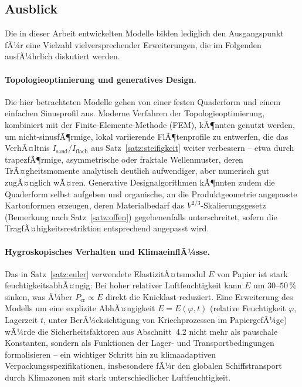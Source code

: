 ﻿\documentclass[a4paper,12pt]{article}
\theoremstyle{definition}
\begin{document}
\subsection{Ausblick}

Die in dieser Arbeit entwickelten Modelle bilden lediglich den Ausgangspunkt fÃ¼r
eine Vielzahl vielversprechender Erweiterungen, die im Folgenden ausfÃ¼hrlich
diskutiert werden.

\paragraph{Topologieoptimierung und generatives Design.}
Die hier betrachteten Modelle gehen von einer festen Quaderform und einem
einfachen Sinusprofil aus. Moderne Verfahren der Topologieoptimierung, kombiniert
mit der Finite-Elemente-Methode (FEM), kÃ¶nnten genutzt werden, um nicht-sinusfÃ¶rmige,
lokal variierende FlÃ¶tenprofile zu entwerfen, die das VerhÃ¤ltnis
$I_{\mathrm{sand}}/I_{\mathrm{flach}}$ aus Satz~\ref{satz:steifigkeit} weiter
verbessern -- etwa durch trapezfÃ¶rmige, asymmetrische oder fraktale Wellenmuster,
deren TrÃ¤gheitsmomente analytisch deutlich aufwendiger, aber numerisch gut
zugÃ¤nglich wÃ¤ren. Generative Designalgorithmen kÃ¶nnten zudem die Quaderform selbst
aufgeben und organische, an die Produktgeometrie angepasste Kartonformen
erzeugen, deren Materialbedarf das $V^{2/3}$-Skalierungsgesetz (Bemerkung nach
Satz~\ref{satz:offen}) gegebenenfalls unterschreitet, sofern die
TragfÃ¤higkeitsrestriktion entsprechend angepasst wird.

\paragraph{Hygroskopisches Verhalten und KlimaeinflÃ¼sse.}
Das in Satz~\ref{satz:euler} verwendete ElastizitÃ¤tsmodul $E$ von Papier ist
stark feuchtigkeitsabhÃ¤ngig: Bei hoher relativer Luftfeuchtigkeit kann $E$ um
$30$--$50\,\%$ sinken, was Ã¼ber $P_{\mathrm{cr}} \propto E$ direkt die Knicklast
reduziert. Eine Erweiterung des Modells um eine explizite AbhÃ¤ngigkeit
$E = E(\varphi, t)$ (relative Feuchtigkeit $\varphi$, Lagerzeit $t$, unter
BerÃ¼cksichtigung von Kriechprozessen im PapiergefÃ¼ge) wÃ¼rde die
Sicherheitsfaktoren aus Abschnitt~4.2 nicht mehr als pauschale Konstanten,
sondern als Funktionen der Lager- und Transportbedingungen formalisieren --
ein wichtiger Schritt hin zu klimaadaptiven Verpackungsspezifikationen,
insbesondere fÃ¼r den globalen Schiffstransport durch Klimazonen mit stark
unterschiedlicher Luftfeuchtigkeit.
\end{document}
